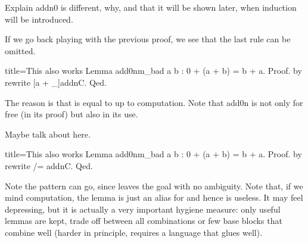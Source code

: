 Explain addn0 is different, why, and that it will be shown later,
when induction will be introduced.

If we go back playing with the previous proof, we see that the
last rule can be omitted.

\begin{coq}{title=This also works}
Lemma add0nm_bad a b : 0 + (a + b) = b + a.
Proof. by rewrite [a + _]addnC. Qed.
\end{coq}

The reason is that  is equal
to  up to computation.
Note that add0n  is not only for free (in its proof) but
also in its use.

Maybe talk about \C{/=} here.

\begin{coq}{title=This also works}
Lemma add0nm_bad a b : 0 + (a + b) = b + a.
Proof. by rewrite /= addnC. Qed.
\end{coq}

Note the pattern can go, since \C{/=} leaves the goal with
no ambiguity.
Note that, if we mind computation, the lemma is just an alias
for  and hence is useless.  It may feel depressing, but
it is actually a very important hygiene measure: only useful lemmas
are kept, trade off between all combinations or few base blocks that
combine well (harder in principle, requires a language that glues well).



